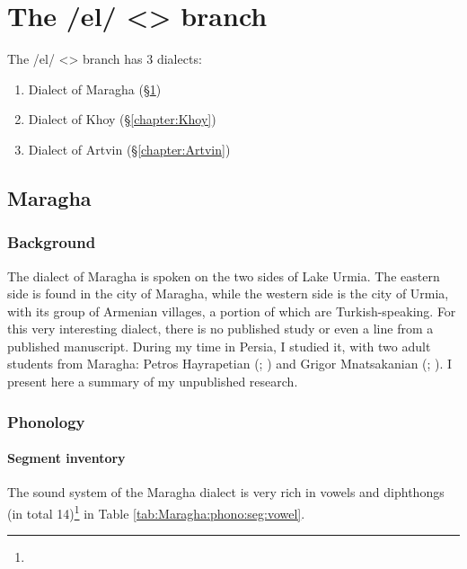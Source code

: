 \part{The /el/ <> branch}

The /el/ <> branch has 3 dialects:

\begin{enumerate}
	\item Dialect of Maragha (\S\ref{chapter:Maragha})
	\item Dialect of Khoy (\S\ref{chapter:Khoy})
	\item Dialect of Artvin (\S\ref{chapter:Artvin})
	
	
\end{enumerate}


\chapter{Maragha}\label{chapter:Maragha}
\section{Background}

\begin{adjarianpage}\label{page:281}\end{adjarianpage}%

The dialect of Maragha is spoken on the two sides of Lake Urmia. The eastern side is found in the city of Maragha, while the western side is the city of Urmia, with its group of Armenian villages, a portion of which are Turkish-speaking. For this very interesting dialect, there is no published study or even a line from a published manuscript. During my time in Persia, I studied it, with two adult students from Maragha: Petros Hayrapetian (; ) and Grigor Mnatsakanian (; ). I present here a summary of my unpublished research. 

\section{Phonology}
\subsection{Segment inventory}

The sound system of the Maragha dialect is very rich in vowels and diphthongs (in total 14)\footnote{} in Table \ref{tab:Maragha:phono:seg:vowel}.

